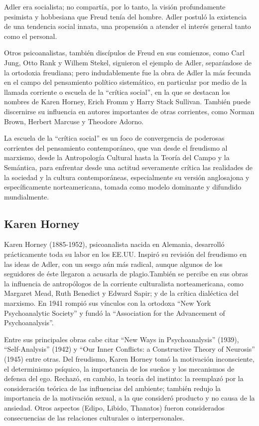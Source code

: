 \documentclass[
]{book}
\begin{document}
Adler era socialista; no compartía, por lo tanto, la visión profundamente pesimista y hobbesiana que Freud tenía del hombre. Adler postuló la existencia de una tendencia social innata, una propensión a atender el interés general tanto como el personal.

Otros psicoanalistas, también discípulos de Freud en sus comienzos, como Carl Jung, Otto Rank y Wilhem Stekel, siguieron el ejemplo de Adler, separándose de la ortodoxia freudiana; pero indudablemente fue la obra de Adler la más fecunda en el campo del pensamiento político sistemático, en particular por medio de la llamada corriente o escuela de la ``crítica social'', en la que se destacan los nombres de Karen Horney, Erich Fromm y Harry Stack Sullivan. También puede discernirse su influencia en autores importantes de otras corrientes, como Norman Brown, Herbert Marcuse y Theodore Adorno.

La escuela de la ``crítica social'' es un foco de convergencia de poderosas corrientes del pensamiento contemporáneo, que van desde el freudismo al marxismo, desde la Antropología Cultural hasta la Teoría del Campo y la Semántica, para enfrentar desde una actitud severamente crítica las realidades de la sociedad y la cultura contemporáneas, especialmente su versión anglosajona y específicamente norteamericana, tomada como modelo dominante y difundido mundialmente.

\hypertarget{karen-horney}{%
\subsection*{Karen Horney}\label{karen-horney}}

Karen Horney (1885-1952), psicoanalista nacida en Alemania, desarrolló prácticamente toda su labor en los EE.UU. Inspiró su revisión del freudismo en las ideas de Adler, con un sesgo aún más radical, aunque algunos de los seguidores de éste llegaron a acusarla de plagio.También se percibe en sus obras la influencia de antropólogos de la corriente culturalista norteamericana, como Margaret Mead, Ruth Benedict y Edward Sapir; y de la crítica dialéctica del marxismo. En 1941 rompió sus vínculos con la ortodoxa ``New York Psychoanalytic Society'' y fundó la ``Association for the Advancement of Psychoanalysis''.

Entre sus principales obras cabe citar ``New Ways in Psychoanalysis'' (1939), ``Self-Analysis'' (1942) y ``Our Inner Conflicts: a Constructive Theory of Neurosis'' (1945) entre otras. Del freudismo, Karen Horney tomó la motivación inconsciente, el determinismo psíquico, la importancia de los sueños y los mecanismos de defensa del ego. Rechazó, en cambio, la teoría del instinto: la reemplazó por la consideración teórica de las influencias del ambiente; también redujo la importancia de la motivación sexual, a la que consideró producto y no causa de la ansiedad. Otros aspectos (Edipo, Libido, Thanatos) fueron considerados consecuencias de las relaciones culturales o interpersonales.
\end{document}
